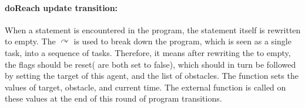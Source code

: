 \paragraph{doReach update transition: }When a  statement is encountered in the program, the statement itself is rewritten to empty. The $\curvearrowright$ is used to break down the program, which is seen as a single task, into a sequence of tasks. Therefore, it means after rewriting the  to empty, the  flags should be reset( are both set to false), which should in turn be followed by setting the target of this agent, and the list of obstacles. The  function sets the values of target, obstacle, and current time. The external function  is called on these values at the end of this round of program transitions.  
\begin{figure}
\label{fig:doreach1}
\end{figure}
